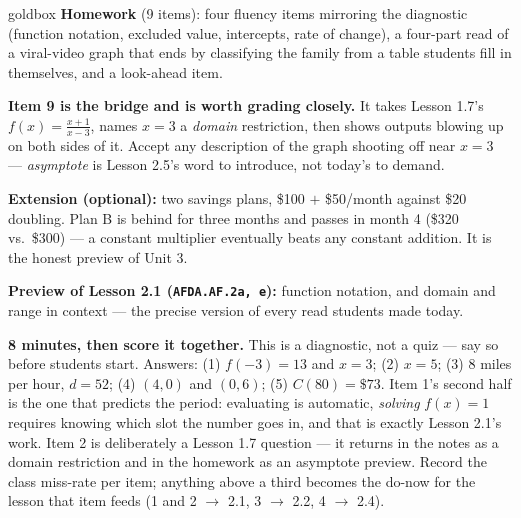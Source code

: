 \documentclass[10pt]{article}
\begin{document}
\boxguard[18]
\begin{skillbox}{goldbox}
\textbf{Homework} (9 items): four fluency items mirroring the diagnostic (function notation,
excluded value, intercepts, rate of change), a four-part read of a viral-video graph that ends by
classifying the family from a table students fill in themselves, and a look-ahead item.

\textbf{Item 9 is the bridge and is worth grading closely.} It takes Lesson 1.7's
$f(x)=\frac{x+1}{x-3}$, names $x=3$ a \emph{domain} restriction, then shows outputs blowing up on
both sides of it. Accept any description of the graph shooting off near $x=3$ ---
\emph{asymptote} is Lesson 2.5's word to introduce, not today's to demand.

\textbf{Extension (optional):} two savings plans, \$100 $+$ \$50/month against \$20 doubling.
Plan B is behind for three months and passes in month 4 (\$320 vs.\ \$300) --- a constant
multiplier eventually beats any constant addition. It is the honest preview of Unit 3.

\textbf{Preview of Lesson 2.1 (\texttt{AFDA.AF.2a, e}):} function notation, and domain and range
in context --- the precise version of every read students made today.
\end{skillbox}

\boxguard[18]
\begin{teachernote}[Warm-Up]
    \textbf{8 minutes, then score it together.} This is a diagnostic, not a quiz --- say so before
    students start. Answers: (1) $f(-3)=13$ and $x=3$; (2) $x=5$; (3) $8$ miles per hour, $d=52$;
    (4) $(4,0)$ and $(0,6)$; (5) $C(80)=\$73$. Item 1's second half is the one that predicts the
    period: evaluating is automatic, \emph{solving} $f(x)=1$ requires knowing which slot the
    number goes in, and that is exactly Lesson 2.1's work. Item 2 is deliberately a Lesson 1.7
    question --- it returns in the notes as a domain restriction and in the homework as an
    asymptote preview. Record the class miss-rate per item; anything above a third becomes the
    do-now for the lesson that item feeds (1 and 2 $\to$ 2.1, 3 $\to$ 2.2, 4 $\to$ 2.4).
\end{teachernote}
\end{document}
